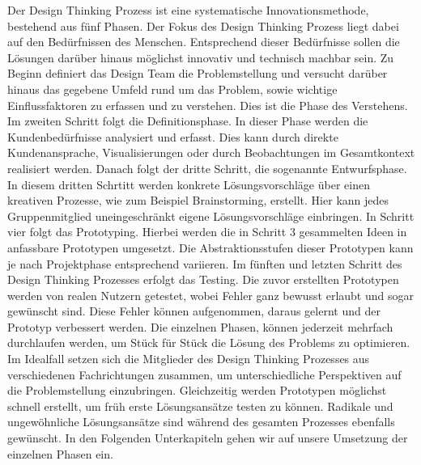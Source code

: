 Der Design Thinking Prozess ist eine systematische Innovationsmethode, bestehend aus fünf Phasen. Der Fokus des Design Thinking Prozess liegt dabei auf den Bedürfnissen des Menschen. Entsprechend dieser Bedürfnisse sollen die Lösungen darüber hinaus möglichst innovativ und technisch machbar sein.
Zu Beginn definiert das Design Team die Problemstellung und versucht darüber hinaus das gegebene Umfeld rund um das Problem, sowie wichtige Einflussfaktoren zu erfassen und zu verstehen. Dies ist die Phase des Verstehens.
Im zweiten Schritt folgt die Definitionsphase. In dieser Phase werden die Kundenbedürfnisse analysiert und erfasst. Dies kann durch direkte Kundenansprache, Visualisierungen oder durch Beobachtungen im Gesamtkontext realisiert werden.
Danach folgt der dritte Schritt, die sogenannte Entwurfsphase. In diesem dritten Schrtitt werden konkrete Lösungsvorschläge über einen kreativen Prozesse, wie zum Beispiel Brainstorming, erstellt. Hier kann jedes Gruppenmitglied uneingeschränkt eigene Lösungsvorschläge einbringen.
In Schritt vier folgt das Prototyping. Hierbei werden die in Schritt 3 gesammelten Ideen in anfassbare Prototypen umgesetzt. Die Abstraktionsstufen dieser Prototypen kann je nach Projektphase entsprechend variieren.
Im fünften und letzten Schritt des Design Thinking Prozesses erfolgt das Testing. Die zuvor erstellten Prototypen werden von realen Nutzern getestet, wobei Fehler ganz bewusst erlaubt und sogar gewünscht sind. Diese Fehler können aufgenommen, daraus gelernt und der Prototyp verbessert werden. 
Die einzelnen Phasen, können jederzeit mehrfach durchlaufen werden, um Stück für Stück die Lösung des Problems zu optimieren. Im Idealfall setzen sich die Mitglieder des Design Thinking Prozesses aus verschiedenen Fachrichtungen zusammen, um unterschiedliche Perspektiven auf die Problemstellung einzubringen. Gleichzeitig werden Prototypen möglichst schnell erstellt, um früh erste Lösungsansätze testen zu können. Radikale und ungewöhnliche Lösungsansätze sind während des gesamten Prozesses ebenfalls gewünscht.
In den Folgenden Unterkapiteln gehen wir auf unsere Umsetzung der einzelnen Phasen ein.